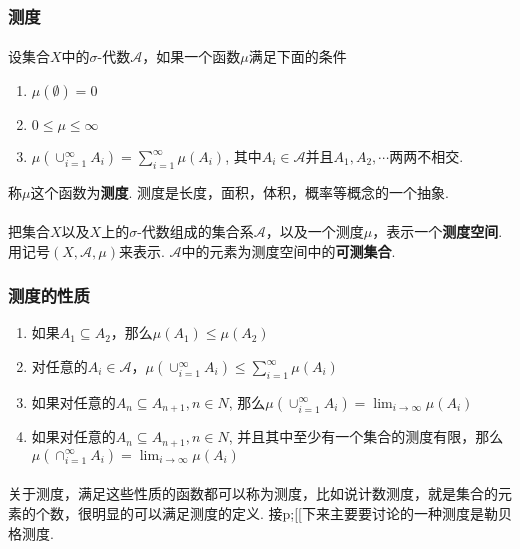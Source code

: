 \subsubsection{测度}
\paragraph{}
设集合$X$中的$\sigma$-代数$\mathcal{A}$，如果一个函数$\mu$满足下面的条件
\begin{enumerate}
\item $\mu(\emptyset) = 0$
\item $0 \leq \mu \leq \infty$
\item $\mu(\cup_{i=1}^\infty A_i) = \sum_{i=1}^\infty \mu(A_i)$, 其中$A_i \in \mathcal{A}$并且$A_1, A_2, \cdots$两两不相交.
\end{enumerate}
称$\mu$这个函数为\textbf{测度}. 测度是长度，面积，体积，概率等概念的一个抽象.

\paragraph{}
把集合$X$以及$X$上的$\sigma$-代数组成的集合系$\mathcal{A}$，以及一个测度$\mu$，表示一个\textbf{测度空间}. 用记号$(X, \mathcal{A}, \mu)$来表示. $\mathcal{A}$中的元素为测度空间中的\textbf{可测集合}.

\subsubsection{测度的性质}
\begin{enumerate}
\item 如果$A_1 \subseteq A_2$，那么$\mu(A_1) \leq \mu(A_2)$
\item 对任意的$A_i \in \mathcal{A}$，$\mu(\cup_{i=1}^\infty A_i) \leq \sum_{i=1}^\infty \mu(A_i)$
\item 如果对任意的$A_n \subseteq A_{n+1}, n \in N$, 那么$\mu(\cup_{i=1}^\infty A_i) = \lim_{i\to \infty} \mu(A_i)$
\item 如果对任意的$A_n \subseteq A_{n+1}, n \in N$, 并且其中至少有一个集合的测度有限，那么$\mu(\cap_{i=1}^\infty A_i) = \lim_{i\to \infty} \mu(A_i)$
\end{enumerate}

\paragraph{}
关于测度，满足这些性质的函数都可以称为测度，比如说计数测度，就是集合的元素的个数，很明显的可以满足测度的定义. 接p;[[下来主要要讨论的一种测度是勒贝格测度. 

